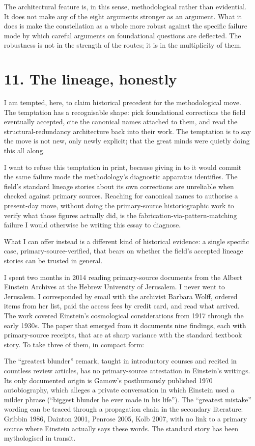 \documentclass[11pt,a4paper]{article}
\begin{document}
The architectural feature is, in this sense, methodological rather than evidential. It does not make any of the eight arguments stronger as an argument. What it does is make the constellation as a whole more robust against the specific failure mode by which careful arguments on foundational questions are deflected. The robustness is not in the strength of the routes; it is in the multiplicity of them.

\section*{11. The lineage, honestly}

I am tempted, here, to claim historical precedent for the methodological move. The temptation has a recognisable shape: pick foundational corrections the field eventually accepted, cite the canonical names attached to them, and read the structural-redundancy architecture back into their work. The temptation is to say the move is not new, only newly explicit; that the great minds were quietly doing this all along.

I want to refuse this temptation in print, because giving in to it would commit the same failure mode the methodology's diagnostic apparatus identifies. The field's standard lineage stories about its own corrections are unreliable when checked against primary sources. Reaching for canonical names to authorise a present-day move, without doing the primary-source historiographic work to verify what those figures actually did, is the fabrication-via-pattern-matching failure I would otherwise be writing this essay to diagnose.

What I can offer instead is a different kind of historical evidence: a single specific case, primary-source-verified, that bears on whether the field's accepted lineage stories can be trusted in general.

I spent two months in 2014 reading primary-source documents from the Albert Einstein Archives at the Hebrew University of Jerusalem. I never went to Jerusalem. I corresponded by email with the archivist Barbara Wolff, ordered items from her list, paid the access fees by credit card, and read what arrived. The work covered Einstein's cosmological considerations from 1917 through the early 1930s. The paper that emerged from it documents nine findings, each with primary-source receipts, that are at sharp variance with the standard textbook story. To take three of them, in compact form:

The ``greatest blunder'' remark, taught in introductory courses and recited in countless review articles, has no primary-source attestation in Einstein's writings. Its only documented origin is Gamow's posthumously published 1970 autobiography, which alleges a private conversation in which Einstein used a milder phrase (``biggest blunder he ever made in his life''). The ``greatest mistake'' wording can be traced through a propagation chain in the secondary literature: Gribbin 1986, Dainton 2001, Penrose 2005, Kolb 2007, with no link to a primary source where Einstein actually says these words. The standard story has been mythologised in transit.
\end{document}
